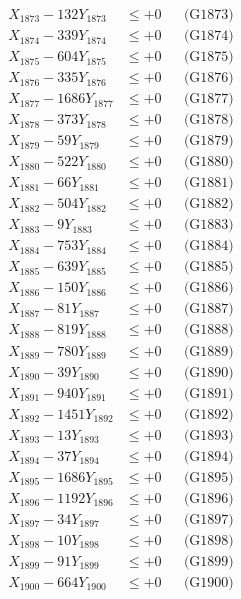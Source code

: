 \documentclass[a4paper,10pt]{article}
\begin{document}
{\begin{align}
X_{1873} - 132Y_{1873} &\leq +0 && \text{(G1873)} \\
X_{1874} - 339Y_{1874} &\leq +0 && \text{(G1874)} \\
X_{1875} - 604Y_{1875} &\leq +0 && \text{(G1875)} \\
X_{1876} - 335Y_{1876} &\leq +0 && \text{(G1876)} \\
X_{1877} - 1686Y_{1877} &\leq +0 && \text{(G1877)} \\
X_{1878} - 373Y_{1878} &\leq +0 && \text{(G1878)} \\
X_{1879} - 59Y_{1879} &\leq +0 && \text{(G1879)} \\
X_{1880} - 522Y_{1880} &\leq +0 && \text{(G1880)} \\
\allowbreak
X_{1881} - 66Y_{1881} &\leq +0 && \text{(G1881)} \\
X_{1882} - 504Y_{1882} &\leq +0 && \text{(G1882)} \\
X_{1883} - 9Y_{1883} &\leq +0 && \text{(G1883)} \\
X_{1884} - 753Y_{1884} &\leq +0 && \text{(G1884)} \\
X_{1885} - 639Y_{1885} &\leq +0 && \text{(G1885)} \\
X_{1886} - 150Y_{1886} &\leq +0 && \text{(G1886)} \\
X_{1887} - 81Y_{1887} &\leq +0 && \text{(G1887)} \\
X_{1888} - 819Y_{1888} &\leq +0 && \text{(G1888)} \\
X_{1889} - 780Y_{1889} &\leq +0 && \text{(G1889)} \\
X_{1890} - 39Y_{1890} &\leq +0 && \text{(G1890)} \\
\allowbreak
X_{1891} - 940Y_{1891} &\leq +0 && \text{(G1891)} \\
X_{1892} - 1451Y_{1892} &\leq +0 && \text{(G1892)} \\
X_{1893} - 13Y_{1893} &\leq +0 && \text{(G1893)} \\
X_{1894} - 37Y_{1894} &\leq +0 && \text{(G1894)} \\
X_{1895} - 1686Y_{1895} &\leq +0 && \text{(G1895)} \\
X_{1896} - 1192Y_{1896} &\leq +0 && \text{(G1896)} \\
X_{1897} - 34Y_{1897} &\leq +0 && \text{(G1897)} \\
X_{1898} - 10Y_{1898} &\leq +0 && \text{(G1898)} \\
X_{1899} - 91Y_{1899} &\leq +0 && \text{(G1899)} \\
X_{1900} - 664Y_{1900} &\leq +0 && \text{(G1900)} \\

\end{align}}
\end{document}
